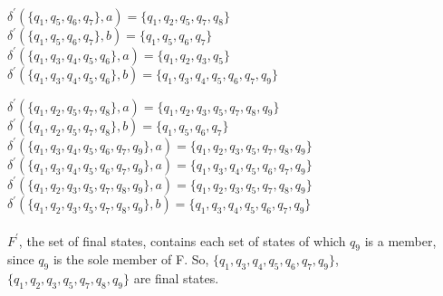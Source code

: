 \documentclass[11pt]{article}
\begin{document}
$\delta^{'}(\{q_1,q_5,q_6,q_7\},a) = \{q_1,q_2,q_5,q_7,q_8\}$  \\
\indent $\delta^{'}(\{q_1,q_5,q_6,q_7\},b) = \{q_1,q_5,q_6,q_7\}$  \\

$\delta^{'}(\{q_1,q_3,q_4,q_5,q_6\},a) = \{q_1,q_2,q_3,q_5\}$  \\
\indent $\delta^{'}(\{q_1,q_3,q_4,q_5,q_6\},b) = \{q_1,q_3,q_4,q_5,q_6,q_7,q_9\}$  \\ \newpage

$\delta^{'}(\{q_1,q_2,q_5,q_7,q_8\},a) = \{q_1,q_2,q_3,q_5,q_7,q_8,q_9\}$  \\
\indent $\delta^{'}(\{q_1,q_2,q_5,q_7,q_8\},b) = \{q_1,q_5,q_6,q_7\}$  \\

$\delta^{'}(\{q_1,q_3,q_4,q_5,q_6,q_7,q_9\},a) = \{q_1,q_2,q_3,q_5,q_7,q_8,q_9\}$  \\
\indent $\delta^{'}(\{q_1,q_3,q_4,q_5,q_6,q_7,q_9\},a) = \{q_1,q_3,q_4,q_5,q_6,q_7,q_9\}$ \\

$\delta^{'}(\{q_1,q_2,q_3,q_5,q_7,q_8,q_9\},a) = \{q_1,q_2,q_3,q_5,q_7,q_8,q_9\}$  \\
\indent $\delta^{'}(\{q_1,q_2,q_3,q_5,q_7,q_8,q_9\},b) = \{q_1,q_3,q_4,q_5,q_6,q_7,q_9\}$  \\ \\

\noindent $F^'$, the set of final states, contains each set of states of which $q_9$ is a member, since $q_9$ is the sole member of F. So,  $\{q_1,q_3,q_4,q_5,q_6,q_7,q_9\}$, $\{q_1,q_2,q_3,q_5,q_7,q_8,q_9\}$ are final states. \\
\end{document}
